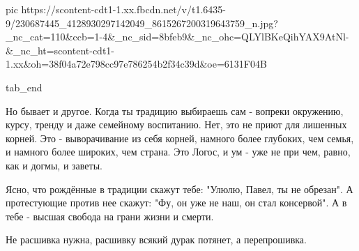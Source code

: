      pic https://scontent-cdt1-1.xx.fbcdn.net/v/t1.6435-9/230687445_4128930297142049_8615267200319643759_n.jpg?_nc_cat=110&ccb=1-4&_nc_sid=8bfeb9&_nc_ohc=QLYlBKeQihYAX9AtNl-&_nc_ht=scontent-cdt1-1.xx&oh=38f04a72e798cc97e786254b2f34c39d&oe=6131F04B

  tab_end
\fi


Но бывает и другое. Когда ты традицию выбираешь сам - вопреки окружению, курсу,
тренду и даже семейному воспитанию. Нет, это не приют для лишенных корней. Это
- выворачивание из себя корней, намного более глубоких, чем семья, и намного
более широких, чем страна. Это Логос, и ум - уже не при чем, равно, как и
догмы, и заветы. 

Ясно, что рождённые в традиции скажут тебе: "Улюлю, Павел, ты не обрезан". А
протестующие против нее скажут: "Фу, он уже не наш, он стал консервой". А в
тебе - высшая свобода на грани жизни и смерти.

Не расшивка нужна, расшивку всякий дурак потянет, а перепрошивка.

